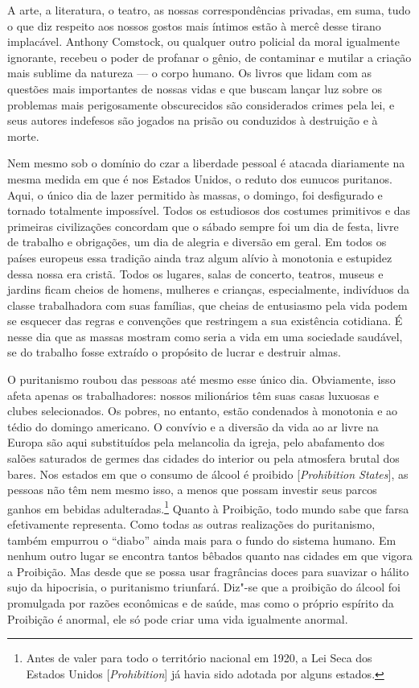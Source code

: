 A arte, a literatura, o teatro, as nossas correspondências privadas, em
suma, tudo o que diz respeito aos nossos gostos mais íntimos estão à
mercê desse tirano implacável. Anthony Comstock, ou qualquer outro
policial da moral igualmente ignorante, recebeu o poder de profanar o
gênio, de contaminar e mutilar a criação mais sublime da natureza --- o
corpo humano. Os livros que lidam com as questões mais importantes de
nossas vidas e que buscam lançar luz sobre os problemas mais
perigosamente obscurecidos são considerados crimes pela lei, e seus
autores indefesos são jogados na prisão ou conduzidos à destruição e à
morte.

Nem mesmo sob o domínio do czar a liberdade pessoal é atacada
diariamente na mesma medida em que é nos Estados Unidos, o reduto dos
eunucos puritanos. Aqui, o único dia de lazer permitido às massas, o
domingo, foi desfigurado e tornado totalmente impossível. Todos os
estudiosos dos costumes primitivos e das primeiras civilizações
concordam que o sábado sempre foi um dia de festa, livre de trabalho e
obrigações, um dia de alegria e diversão em geral. Em todos os países
europeus essa tradição ainda traz algum alívio à monotonia e estupidez
dessa nossa era cristã. Todos os lugares, salas de concerto, teatros, %
museus e jardins ficam cheios de homens, mulheres e crianças,
especialmente, indivíduos da classe trabalhadora com suas famílias, que
cheias de entusiasmo pela vida podem se esquecer das regras e convenções
que restringem a sua existência cotidiana. É nesse dia que as massas
mostram como seria a vida em uma sociedade saudável, se do trabalho
fosse extraído o propósito de lucrar e destruir almas.

O puritanismo roubou das pessoas até mesmo esse único dia. Obviamente,
isso afeta apenas os trabalhadores: nossos milionários têm suas casas
luxuosas e clubes selecionados. Os pobres, no entanto, estão condenados
à monotonia e ao tédio do domingo americano. O convívio e a diversão da
vida ao ar livre na Europa são aqui substituídos pela melancolia da
igreja, pelo abafamento dos salões saturados de germes das cidades do
interior ou pela atmosfera brutal dos bares. Nos estados em que o
consumo de álcool é proibido {[}\emph{Prohibition States}{]}, as pessoas
não têm nem mesmo isso, a menos que possam investir seus parcos ganhos
em bebidas adulteradas.\footnote{Antes de valer para todo o território
  nacional em 1920, a Lei Seca dos Estados Unidos
  {[}\emph{Prohibition}{]} já havia sido adotada por alguns estados.}
Quanto à Proibição, todo mundo sabe que farsa efetivamente representa.
Como todas as outras realizações do puritanismo, também empurrou o
``diabo'' ainda mais para o fundo do sistema humano. Em nenhum outro
lugar se encontra tantos bêbados quanto nas cidades em que vigora a
Proibição. Mas desde que se possa usar fragrâncias doces para suavizar o
hálito sujo da hipocrisia, o puritanismo triunfará. Diz"-se que a
proibição do álcool foi promulgada por razões econômicas e de saúde, mas
como o próprio espírito da Proibição é anormal, ele só pode criar uma
vida igualmente anormal.

